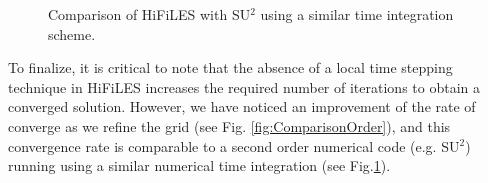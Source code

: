 \begin{figure}
\begin{center}
\begin{minipage}[t]{0.48\columnwidth}
\caption{Comparison of HiFiLES with SU$^2$ using a similar time integration scheme.}
\label{fig:Comparison_SecondOrder}
\end{minipage}
\end{center}
\end{figure}

To finalize, it is critical to note that the absence of a local time stepping technique in HiFiLES increases the required number of iterations to obtain a converged solution. However, we have noticed an improvement of the rate of converge as we refine the grid (see Fig. \ref{fig:ComparisonOrder}), and this convergence rate is comparable to a second order numerical code (e.g. SU$^2$) running using a similar numerical time integration (see Fig.\ref{fig:Comparison_SecondOrder}).
